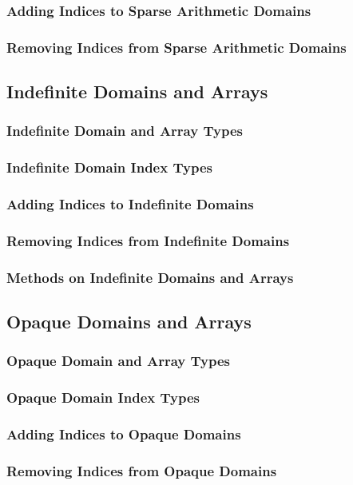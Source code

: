 \documentclass[10pt,twoside,titlepage]{article}
\begin{document}
\subsubsection{Adding Indices to Sparse Arithmetic Domains}
\subsubsection{Removing Indices from Sparse Arithmetic Domains}
\subsection{Indefinite Domains and Arrays}
\subsubsection{Indefinite Domain and Array Types}
\subsubsection{Indefinite Domain Index Types}
\subsubsection{Adding Indices to Indefinite Domains}
\subsubsection{Removing Indices from Indefinite Domains}
\subsubsection{Methods on Indefinite Domains and Arrays}
\subsection{Opaque Domains and Arrays}
\subsubsection{Opaque Domain and Array Types}
\subsubsection{Opaque Domain Index Types}
\subsubsection{Adding Indices to Opaque Domains}
\subsubsection{Removing Indices from Opaque Domains}
\end{document}
